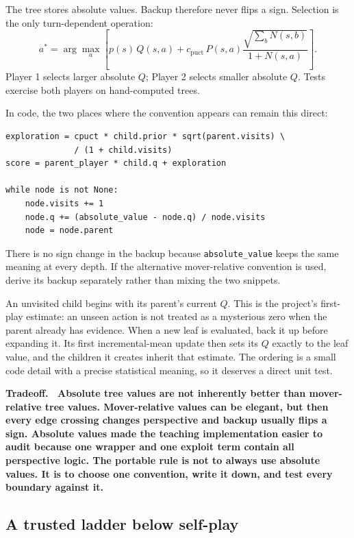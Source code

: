 \documentclass[10.5pt,letterpaper]{article}
\newcommand{\boxtitle}[1]{\sffamily\bfseries\color{deepblue}#1.\ }
\newcommand{\code}[1]{\texttt{\small #1}}
\begin{document}
The tree stores absolute values. Backup therefore never flips a sign. Selection
is the only turn-dependent operation:
\[
  a^* = \arg\max_a
  \left[
    p(s)\,Q(s,a) +
    c_{\mathrm{puct}}\,P(s,a)
    \frac{\sqrt{\sum_b N(s,b)}}{1+N(s,a)}
  \right].
\]
Player 1 selects larger absolute $Q$; Player 2 selects smaller absolute $Q$.
Tests exercise both players on hand-computed trees.

In code, the two places where the convention appears can remain this direct:

\begin{lstlisting}[style=azcode]
exploration = cpuct * child.prior * sqrt(parent.visits) \
              / (1 + child.visits)
score = parent_player * child.q + exploration

while node is not None:
    node.visits += 1
    node.q += (absolute_value - node.q) / node.visits
    node = node.parent
\end{lstlisting}

There is no sign change in the backup because \code{absolute\_value} keeps the
same meaning at every depth. If the alternative mover-relative convention is
used, derive its backup separately rather than mixing the two snippets.

An unvisited child begins with its parent's current $Q$. This is the project's
first-play estimate: an unseen action is not treated as a mysterious zero when
the parent already has evidence. When a new leaf is evaluated, back it up
before expanding it. Its first incremental-mean update then sets its $Q$ exactly
to the leaf value, and the children it creates inherit that estimate. The
ordering is a small code detail with a precise statistical meaning, so it
deserves a direct unit test.

\begin{plainbox}
\boxtitle{Tradeoff}
Absolute tree values are not inherently better than mover-relative tree values.
Mover-relative values can be elegant, but then every edge crossing changes
perspective and backup usually flips a sign. Absolute values made the teaching
implementation easier to audit because one wrapper and one exploit term contain
all perspective logic. The portable rule is not to always use absolute values.
It is to choose one convention, write it down, and test every boundary against
it.
\end{plainbox}

\subsection{A trusted ladder below self-play}
\end{document}

